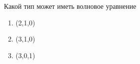 Какой тип может иметь волновое уравнение

\begin{enumerate}[label=\arabic*)]
    \item (2,1,0)
    \item (3,1,0)
    \item (3,0,1)
\end{enumerate}


